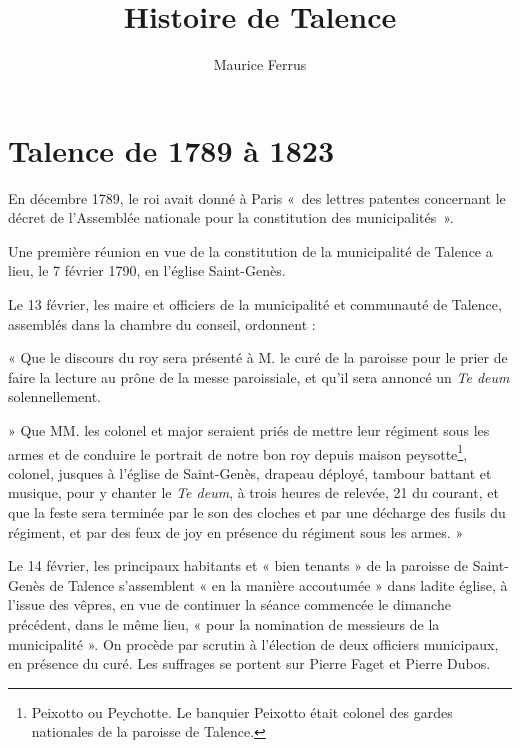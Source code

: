 \documentclass[a4paper,11pt]{book}
\begin{document}
\title{Histoire de Talence}
\author{Maurice Ferrus}
\frontmatter
\maketitle

\mainmatter{}

\chapter[Talence de 1789 à 1823]{Talence de 1789 à 1823\raisebox{.3\baselineskip}{\normalsize\footnotemark}}

En décembre 1789, le roi avait donné à Paris «~des lettres patentes concernant le décret de l'Assemblée nationale pour la constitution des municipalités~».

Une première réunion en vue de la constitution de la municipalité de Talence a lieu, le 7 février 1790, en l'église Saint-Genès.

Le 13 février, les maire et officiers de la municipalité et communauté de Talence, assemblés dans la chambre du conseil, ordonnent :

« Que le discours du roy sera présenté à M. le curé de la paroisse pour le prier de faire la lecture au prône de la messe paroissiale, et qu'il sera annoncé un \textit{Te deum} solennellement.

» Que MM. les colonel et major seraient priés de mettre leur régiment sous les armes et de conduire le portrait de notre bon roy depuis maison peysotte\footnote{Peixotto ou Peychotte. Le banquier Peixotto était colonel des gardes nationales de la paroisse de Talence.}, colonel, jusques à l'église de Saint-Genès, drapeau déployé, tambour battant et musique, pour y chanter le \textit{Te deum}, à trois heures de relevée, 21 du courant, et que la feste sera terminée par le son des cloches et par une décharge des fusils du régiment, et par des feux de joy en présence du régiment sous les armes. »

Le 14 février, les principaux habitants et « bien tenants » de la paroisse de Saint-Genès de Talence s'assemblent « en la manière accoutumée » dans ladite église, à l'issue des vêpres, en vue de continuer la séance commencée le dimanche précédent, dans le même lieu, « pour la nomination de messieurs de la municipalité ». On procède par scrutin à l'élection de deux officiers municipaux, en présence du curé. Les suffrages se portent sur Pierre Faget et Pierre Dubos.
\end{document}
